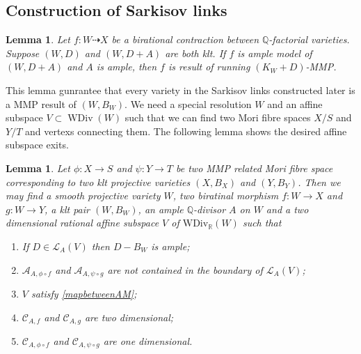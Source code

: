 \documentclass{article}
\newtheorem{lem}[defn]{Lemma}
\begin{document}
\subsection{Construction of Sarkisov links}
\begin{lem}
  \cite[Lemma 3.6]{haconSarkisovProgram2011} Let $f:W\dashrightarrow X $ be a birational contraction between $\mathbb{Q}$-factorial varieties. Suppose $(W,D)$ and $(W,D+A)$ are both klt. If $f$ is ample model of $(W,D+A)$ and $A$ is ample, then $f$ is result of running $(K_{W}+D)$-MMP.
\end{lem}
This lemma gunrantee that every variety in the Sarkisov links constructed later is a MMP result of $(W,B_{W})$.
We need a special resolution $W$ and an   affine subspace $V \subset \operatorname{WDiv}(W)$ such that we can find two Mori fibre spaces $X/S$ and $Y/T$ and vertexs connecting them. The following  lemma shows the desired affine subspace exits. 
\begin{lem}\label{keylemma}
  \cite[Lemma 4.1]{haconSarkisovProgram2011} Let $ \phi:X\to S $ and $ \psi :Y\to T  $ be two MMP related Mori fibre space corresponding to two klt projective varieties $ (X,B_X) $ and $ (Y,B_Y) $. Then we may find a smooth projective variety $ W $, two biratinal morphism $ f:W\to X $ and $ g:W\to Y $, a klt pair $ (W,B_{W}) $, an ample $ \mathbb{Q} $-divisor $ A $ on $ W $ and a two dimensional rational affine subspace $ V $ of $ \mathrm{WDiv}_\mathbb{R}(W) $ such that 
  \begin{enumerate}
    \item If $ D\in \mathcal{L}_A(V) $ then $ D-B_W $ is ample;
    \item $ \mathcal{A}_{A,\phi\circ f} $ and $ \mathcal{A}_{A,\psi\circ g} $ are not contained in the boundary of $ \mathcal{L}_A(V) $;
    \item $ V $ satisfy \ref{mapbetweenAM};
    \item $ \mathcal{C}_{A,f} $ and $ \mathcal{C}_{A,g} $ are two dimensional;
    \item $ \mathcal{C}_{A,\phi\circ f} $ and $ \mathcal{C}_{A,\psi\circ g} $ are one dimensional.
  \end{enumerate}
\end{lem}
\end{document}
